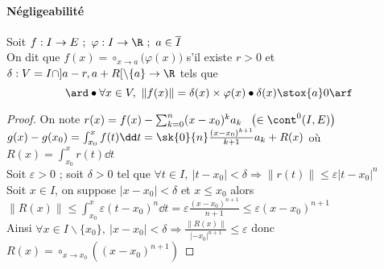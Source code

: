 {    \paragraph{Négligeabilité}
        Soit $f:I\rightarrow E ~;~\varphi : I\rightarrow \R ~;~a\in \overline{I}$ \\ On dit que \underline{$f(x) = \circ_{x\rightarrow a} 
        \big( \varphi (x) \big)$} s'il existe $r>0$ et $\delta : V=I\cap ]a-r,a+R[ \backslash\{a\} \rightarrow \R$ tels que \[ \ard \bullet 
        \forall x\in V ,~\|f(x)\| = \delta (x) \times \varphi (x) \\ \bullet \delta (x) \stox{a} 0 \arf \] \vspace*{-0.7cm}\trait
    \begin{proof}
    On note $r(x) = f(x) - \sum_{k=0}^n (x-x_0)^k a_k ~~\left(\in\cont^0 (I,E) \right)$ \\ $g(x)-g(x_0) = \int_{x_0}^x f(t)\dd t = \sk{0}{n} 
    \frac{(x-x_0)^{k+1}}{k+1} a_k + R(x)$ où $R(x) = \int_{x_0}^x r(t) \dd t$\\
    Soit $\varepsilon >0$ ; soit $\delta >0$ tel que $\forall t\in I ,~|t-x_0| <\delta \Rightarrow \|r(t)\| \leq \varepsilon |t-x_0|^n$ \\
    Soit $x\in I$, on suppose $|x-x_0| <\delta$ et $x\leq x_0$ alors $\|R(x)\| \leq \int_{x_0}^x \varepsilon (t-x_0)^n \dd t = \varepsilon 
    \frac{(x-x_0)^{n+1}}{n+1} \leq \varepsilon (x-x_0)^{n+1}$ \\ Ainsi $\forall x\in I \backslash \{x_0\} ,~|x-x_0| <\delta \Rightarrow 
    \frac{ \|R(x)\|}{|-x_0|^{n+1}} \leq \varepsilon$ donc $R(x) = \circ_{x\rightarrow x_0} \left( (x-x_0)^{n+1} \right)$ 
    \end{proof}
}
